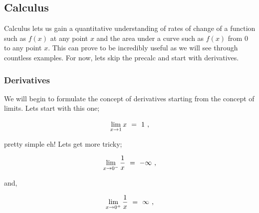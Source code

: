 \documentclass{article}
\begin{document}
\subsection{Calculus}

Calculus lets us gain a quantitative understanding of rates of change of a function such as \begin{math} f(x) \end{math} at any point \begin{math} x \end{math} and the area under a curve such as \begin{math} f(x) \end{math} from \begin{math} 0 \end{math} to any point \begin{math} x \end{math}. This can prove to be incredibly useful as we will see through countless examples. For now, lets skip the precalc and start with derivatives.

\subsubsection{Derivatives}

We will begin to formulate the concept of derivatives starting from the concept of limits. Lets start with this one;

\begin{equation} \label{eq:301} 
\lim_{x\to1} x \hspace{0.125cm} = \hspace{0.125cm} 1 \hspace{0.125cm} ,
\end{equation}

pretty simple eh! Lets get more tricky;

\begin{equation} \label{eq:302} 
\lim_{x\to0^{-}} \frac{1}{x} \hspace{0.125cm} = \hspace{0.125cm} -\infty \hspace{0.125cm} ,
\end{equation}

and,

\begin{equation} \label{eq:303} 
\lim_{x\to0^{+}} \frac{1}{x} \hspace{0.125cm} = \hspace{0.125cm} \infty \hspace{0.125cm} ,
\end{equation}
\end{document}
